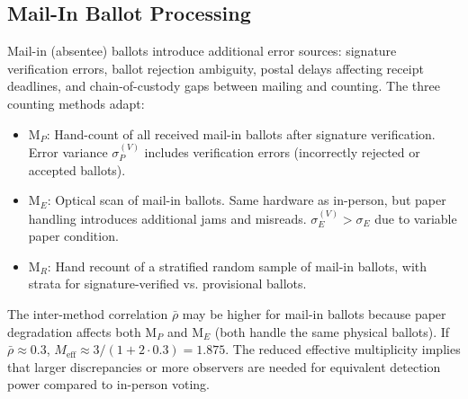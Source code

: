 \documentclass[11pt,a4paper]{article}
\theoremstyle{definition}
\newcommand{\method}[1]{\mathrm{M}_{#1}}
\begin{document}
\subsection{Mail-In Ballot Processing}
Mail-in (absentee) ballots introduce additional error sources: signature verification errors, ballot rejection ambiguity, postal delays affecting receipt deadlines, and chain-of-custody gaps between mailing and counting. The three counting methods adapt:
\begin{itemize}
    \item $\method{P}$: Hand-count of all received mail-in ballots after signature verification. Error variance $\sigma_P^{(V)}$ includes verification errors (incorrectly rejected or accepted ballots).
    \item $\method{E}$: Optical scan of mail-in ballots. Same hardware as in-person, but paper handling introduces additional jams and misreads. $\sigma_E^{(V)} > \sigma_E$ due to variable paper condition.
    \item $\method{R}$: Hand recount of a stratified random sample of mail-in ballots, with strata for signature-verified vs. provisional ballots.
\end{itemize}
The inter-method correlation $\bar{\rho}$ may be higher for mail-in ballots because paper degradation affects both $\method{P}$ and $\method{E}$ (both handle the same physical ballots). If $\bar{\rho} \approx 0.3$, $M_{\text{eff}} \approx 3 / (1 + 2 \cdot 0.3) = 1.875$. The reduced effective multiplicity implies that larger discrepancies or more observers are needed for equivalent detection power compared to in-person voting.
\end{document}
